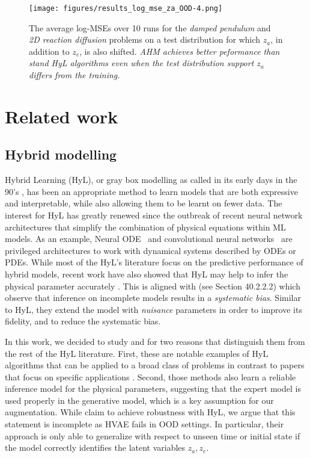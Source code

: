 \begin{figure}
    \centering
    \texttt{[image: figures/results\_log\_mse\_za\_OOD-4.png]}
    \vspace{-2em}
    \caption{The average log-MSEs over 10 runs for the \textit{damped pendulum} and \textit{2D reaction diffusion} problems on a test distribution for which $z_a$, in addition to $z_e$, is also shifted. \textit{AHM achieves better peformance than stand HyL algorithms even when the test distribution support $z_a$ differs from the training.}}
    \label{fig:za_shifted}
    \vspace{-1.em}
\end{figure}

\section{Related work}
\subsection{Hybrid modelling}
Hybrid Learning (HyL), or gray box modelling as called in its early days in the 90's \citep{old_hl_1, old_hl_2, old_hl_3, old_hl_4, old_hl_5}, has been an appropriate method to learn models that are both expressive and interpretable, while also allowing them to be learnt on fewer data. The interest for HyL \citep{hl_1, hl_2, hl_3, hl_4, hl_5, hl_6, metnet2} has greatly renewed since the outbreak of recent neural network architectures that simplify the combination of physical equations within ML models. As an example, Neural ODE~\citep{NODE} and convolutional neural networks~\citep[][CNN]{lecun_cnn} are privileged architectures to work with dynamical systems described by ODEs or PDEs. While most of the HyL's literature focus on the predictive performance of hybrid models, recent work have also showed that HyL may help to infer the physical parameter accurately \citep{APHYNITY, HVAE}. This is aligned with \citet{nuisance_para} (see Section 40.2.2.2) which observe that inference on incomplete models results in a \textit{systematic bias}. Similar to HyL, they extend the model with \textit{nuisance} parameters in order to improve its fidelity, and to reduce the systematic bias.

In this work, we decided to study \citet{APHYNITY} and \citet{HVAE} for two reasons that distinguish them from the rest of the HyL literature. First, these are notable examples of HyL algorithms that can be applied to a broad class of problems in contrast to papers that focus on specific applications \citep{hl_2,hl_3}. Second, those methods also learn a reliable inference model for the physical parameters, suggesting that the expert model is used properly in the generative model, which is a key assumption for our augmentation. While \citet{HVAE} claim to achieve robustness with HyL, we argue that this statement is incomplete as HVAE fails in OOD settings. In particular, their approach is only able to generalize with respect to unseen time or initial state if the model correctly identifies the latent variables $z_a, z_e$.

